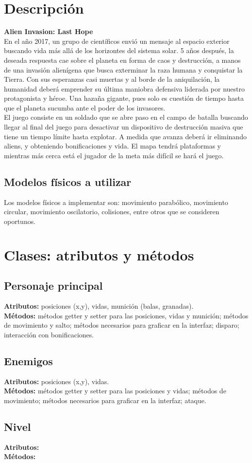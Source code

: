 \documentclass{article}
\begin{document}
\section{Descripción}
\textbf{Alien Invasion: Last Hope}\\

En el año 2017, un grupo de científicos envió un mensaje al espacio exterior buscando vida más allá de los horizontes del sistema solar. 5 años después, la deseada respuesta cae sobre el planeta en forma de caos y destrucción, a manos de una invasión alienígena que busca exterminar la raza humana y conquistar la Tierra. Con sus esperanzas casi muertas y al borde de la aniquilación, la humanidad deberá emprender su última maniobra defensiva liderada por nuestro protagonista y héroe. Una hazaña gigante, pues solo es cuestión de tiempo hasta que el planeta sucumba ante el poder de los invasores.\\

El juego consiste en un soldado que se abre paso en el campo de batalla buscando llegar al final del juego para desactivar un dispositivo de destrucción masiva que tiene un tiempo límite hasta explotar. A medida que avanza deberá ir eliminando aliens, y obteniendo bonificaciones y vida. El mapa tendrá plataformas y mientras más cerca está el jugador de la meta más difícil se hará el juego.

\subsection{Modelos físicos a utilizar}
Los modelos físicos a implementar son: movimiento parabólico, movimiento circular, movimiento oscilatorio, colisiones, entre otros que se consideren oportunos.


\section{Clases: atributos y métodos}

\subsection{Personaje principal}
\noindent\textbf{Atributos:} posiciones (x,y), vidas, munición (balas, granadas).\\
\textbf{Métodos:} métodos getter y setter para las posiciones, vidas y munición; métodos de movimiento y salto; métodos necesarios para graficar en la interfaz; disparo; interacción con bonificaciones.

\subsection{Enemigos}
\noindent\textbf{Atributos:} posiciones (x,y), vidas.\\
\textbf{Métodos:} métodos getter y setter para las posiciones y vidas; métodos de movimiento; métodos necesarios para graficar en la interfaz; ataque.

\subsection{Nivel}
\noindent\textbf{Atributos:}\\
\textbf{Métodos:}
\end{document}
